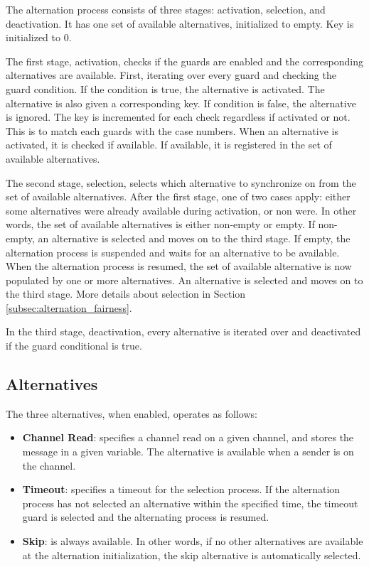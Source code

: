 The alternation process consists of three stages: activation, selection, and deactivation. It has one set of available alternatives, initialized to empty. Key is initialized to 0.

The first stage, activation, checks if the guards are enabled and the corresponding alternatives are available. First, iterating over every guard and checking the guard condition. If the condition is true, the alternative is activated. The alternative is also given a corresponding key. If condition is false, the alternative is ignored. The key is incremented for each check regardless if activated or not. This is to match each guards with the case numbers. When an alternative is activated, it is checked if available. If available, it is registered in the set of available alternatives.

The second stage, selection, selects which alternative to synchronize on from the set of available alternatives. After the first stage, one of two cases apply: either some alternatives were already available during activation, or non were. In other words, the set of available alternatives is either non\hyp{}empty or empty. If non\hyp{}empty, an alternative is selected and moves on to the third stage. If empty, the alternation process is suspended and waits for an alternative to be available. When the alternation process is resumed, the set of available alternative is now populated by one or more alternatives. An alternative is selected and moves on to the third stage. More details about selection in Section \ref{subsec:alternation_fairness}.

In the third stage, deactivation, every alternative is iterated over and deactivated if the guard conditional is true.


\subsection{Alternatives}

The three alternatives, when enabled, operates as follows:

\begin{itemize}[topsep=0em,itemsep=-1em,partopsep=0.5em,parsep=1em]
    \item \textbf{Channel Read}: specifies a channel read on a given channel, and stores the message in a given variable. The alternative is available when a sender is on the channel. 
    
    \item \textbf{Timeout}: specifies a timeout for the selection process. If the alternation process has not selected an alternative within the specified time, the timeout guard is selected and the alternating process is resumed. 
    
    \item \textbf{Skip}: is always available. In other words, if no other alternatives are available at the alternation initialization, the skip alternative is automatically selected. 
\end{itemize}

